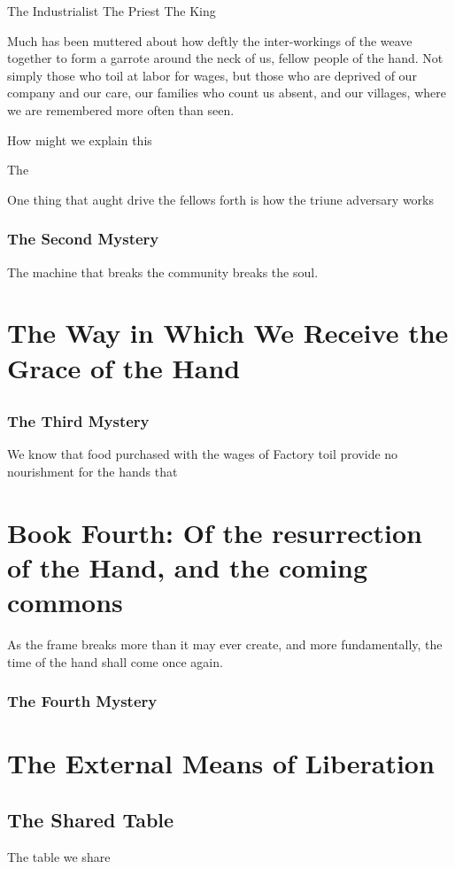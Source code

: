 \documentclass[10pt]{book}
\begin{document}
The Industrialist
The Priest
The King

Much has been muttered about how deftly the inter-workings of the %
weave together to form a garrote around the neck of us, fellow people of the hand.
Not simply those who toil at labor for wages, but those who are deprived of our
company and our care, our families who count us absent, and our villages, where we
are remembered more often than seen. 

How might we explain this 

The 

One thing that aught drive the fellows forth is how the triune adversary works


\subsection{The Second Mystery}
The machine that breaks the community breaks the soul.

\chapter{The Way in Which We Receive the Grace of the Hand}
\section{}
\subsection{The Third Mystery}
We know that food purchased with the wages of Factory toil provide no nourishment for the hands that 

\chapter[Book Fourth]{Book Fourth: Of the resurrection of the Hand, and the coming commons}
As the frame breaks more than it may ever create, and more fundamentally, the time of the hand shall come once again. 
\subsection{ The Fourth Mystery }
\chapter{ The External Means of Liberation }
\section{The Shared Table}
The table we share 
\end{document}
